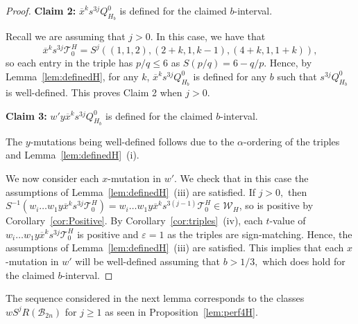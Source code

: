 \documentclass[11pt, reqno]{amsart}
\theoremstyle{remark}
\numberwithin{equation}{subsection}
\numberwithin{figure}{section}
\theoremstyle{customremark}
\newcommand{\Tt}{\mathcal{T}}
\newcommand{\ov}{\overline}
\newcommand{\al}{{\alpha}}
\newcommand{\eps}{\varepsilon}
\begin{document}
\begin{proof}
 

    {\bf Claim 2:} $\ov{x}^ks^{3j}Q_{H_b}^0$ is defined for the claimed $b$-interval.

    Recall we are assuming that $j>0.$ In this case, we have that \[\ov{x}^ks^{3j}\Tt_0^H=S^j\left((1,1,2),(2+k,1,k-1),(4+k,1,1+k)\right),\] 
    so each entry in the triple has $p/q \leq 6$ as $S(p/q)=6-q/p.$ Hence, by Lemma~\ref{lem:definedH}, for any $k$, $\ov{x}^ks^{3j}Q_{H_b}^0$ is defined for any $b$ such that $s^{3j}Q_{H_b}^0$ is well-defined. This proves Claim 2 when $j>0.$ 


    {\bf Claim 3:} $w'y\ov{x}^ks^{3j}Q_{H_b}^0$ is defined for the claimed $b$-interval.

    The $y$-mutations being well-defined follows due to the $\al$-ordering of the triples and Lemma~\ref{lem:definedH}~(i). 

    
     We now consider each $x$-mutation in $w'.$ We check that in this case the assumptions of Lemma~\ref{lem:definedH}~(iii) are satisfied.  If $j> 0,$ then $S^{-1}(w_i\hdots w_1 y \ov{x}^ks^{3j}\Tt_0^H)=w_i\hdots w_1 y \ov{x}^ks^{3(j-1)}\Tt_0^H \in \mathcal{W}_H$, so is positive by Corollary~\ref{cor:Positive}. By Corollary~\ref{cor:triples}~(iv), each $t$-value of $w_i\hdots w_1 y \ov{x}^ks^{3j}\Tt_0^H$ is positive and $\eps=1$ as the triples are sign-matching. Hence, the assumptions of Lemma~\ref{lem:definedH}~(iii) are satisfied. This implies that each $x$-mutation in $w'$ will be well-defined assuming that $b>1/3,$ which does hold for the claimed $b$-interval.  
\end{proof} 

The sequence considered in the next lemma corresponds to the classes $wS^jR(\mathcal{B}_{2n})$ for $j \geq 1$ as seen in Proposition~\ref{lem:perf4H}. 
\end{document}
